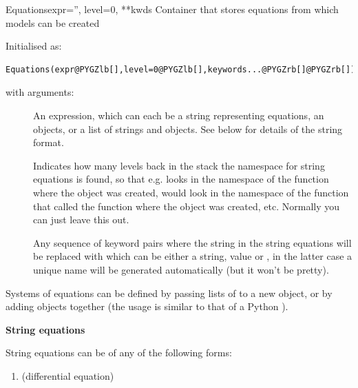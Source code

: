 \documentclass[letterpaper,10pt,english]{manual}
\begin{document}
\hypertarget{brian.Equations}{}\begin{classdesc}{Equations}{expr='', level=0, **kwds}
Container that stores equations from which models can be created

Initialised as:

\begin{Verbatim}[commandchars=@\[\]]
Equations(expr@PYGZlb[],level=0@PYGZlb[],keywords...@PYGZrb[]@PYGZrb[])
\end{Verbatim}

with arguments:
\begin{description}
\item[]
An expression, which can each be a string representing equations,
an \hyperlink{brian.Equations}{} objects, or a list of strings and \hyperlink{brian.Equations}{} objects.
See below for details of the string format.

\item[]
Indicates how many levels back in the stack the namespace for string
equations is found, so that e.g.  looks in the
namespace of the function where the \hyperlink{brian.Equations}{} object was created,
 would look in the namespace of the function that called the
function where the \hyperlink{brian.Equations}{} object was created, etc.
Normally you can just leave this out.

\item[]
Any sequence of keyword pairs  where the string 
in the string equations will be replaced with  which can
be either a string, value or , in the latter case a unique
name will be generated automatically (but it won't be pretty).

\end{description}

Systems of equations can be defined by passing lists of \hyperlink{brian.Equations}{} to a
new \hyperlink{brian.Equations}{} object, or by adding \hyperlink{brian.Equations}{} objects together (the usage
is similar to that of a Python ).

\textbf{String equations}

String equations can be of any of the following forms:
\begin{enumerate}
\item {} 
 (differential equation)


\end{enumerate}
\end{classdesc}
\end{document}
